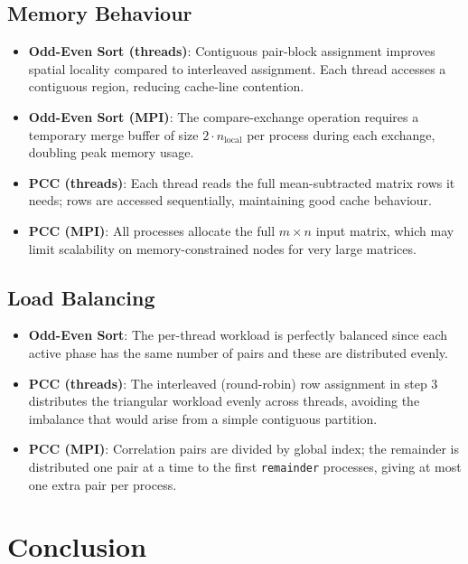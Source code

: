 \documentclass[11pt,a4paper]{article}
\begin{document}
\subsection{Memory Behaviour}

\begin{itemize}
    \item \textbf{Odd-Even Sort (threads)}: Contiguous pair-block assignment improves spatial
          locality compared to interleaved assignment. Each thread accesses a contiguous region,
          reducing cache-line contention.
    \item \textbf{Odd-Even Sort (MPI)}: The compare-exchange operation requires a temporary
          merge buffer of size $2 \cdot n_{\text{local}}$ per process during each exchange,
          doubling peak memory usage.
    \item \textbf{PCC (threads)}: Each thread reads the full mean-subtracted matrix rows it
          needs; rows are accessed sequentially, maintaining good cache behaviour.
    \item \textbf{PCC (MPI)}: All processes allocate the full $m \times n$ input matrix,
          which may limit scalability on memory-constrained nodes for very large matrices.
\end{itemize}

\subsection{Load Balancing}

\begin{itemize}
    \item \textbf{Odd-Even Sort}: The per-thread workload is perfectly balanced since each
          active phase has the same number of pairs and these are distributed evenly.
    \item \textbf{PCC (threads)}: The interleaved (round-robin) row assignment in step 3
          distributes the triangular workload evenly across threads, avoiding the imbalance that
          would arise from a simple contiguous partition.
    \item \textbf{PCC (MPI)}: Correlation pairs are divided by global index; the remainder is
          distributed one pair at a time to the first \texttt{remainder} processes, giving at
          most one extra pair per process.
\end{itemize}

\section{Conclusion}
\end{document}
